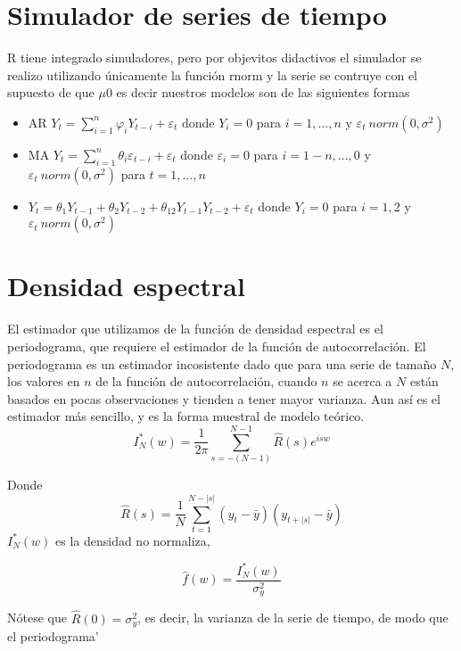 \documentclass[12pt,oneside]{book}
\renewcommand{\phi}{\varphi}
\renewcommand{\epsilon}{\varepsilon}
\begin{document}
 \section{Simulador de series de tiempo} %
 \label{sec:simulador_de_series_de_tiempo}
 R tiene integrado simuladores, pero por objevitos didactivos el simulador se realizo utilizando \'unicamente la funci\'on rnorm y la serie se contruye con el supuesto de que $\mu0$ es decir nuestros modelos son de las siguientes formas

\begin{itemize}
	\item AR $Y_t = \sum^n_{i=1}\phi_i Y_{t-i} + \epsilon_t$ donde $Y_i=0$ para $i=1, \dots, n$ y $\epsilon_t~norm(0,\sigma^2)$
	\item MA $Y_t = \sum^n_{i=1}\theta_i \epsilon_{t-i} + \epsilon_t$ donde $\epsilon_i=0$ para $i=1-n, \dots, 0$ y $\epsilon_t~norm(0,\sigma^2)$ para $t=1, \dots, n$
	\item $Y_t=\theta_1Y_{t-1}+\theta_2Y_{t-2}+\theta_{12}Y_{t-1}Y_{t-2}+\epsilon_t$ donde $Y_i=0$ para $i=1, 2$ y $\epsilon_t~norm(0, \sigma^2)$
\end{itemize}

\section{Densidad espectral} %
\label{sec:densidad_espectral}
El estimador que utilizamos de la funci\'on de densidad espectral es el periodograma, que requiere el estimador de la funci\'on de autocorrelaci\'on. El periodograma es un estimador incosistente dado que para una serie de tama\~no $N$, los valores en $n$ de la funci\'on de autocorrelaci\'on, cuando $n$ se acerca a $N$ est\'an basados en pocas observaciones y tienden a tener mayor varianza. Aun as\'i es el estimador m\'as sencillo, y es la forma muestral de modelo te\'orico.\\


$$I^*_{N}(w)=\frac{1}{2\pi}\sum^{N-1}_{s=-(N-1)}\hat{R}(s)e^{isw}$$

Donde 
$$\hat{R}(s)=\frac{1}{N}\sum^{N-|s|}_{t=1}(y_t-\bar{y})(y_{t+|s|}-\bar{y})$$
$I^*_{N}(w)$ es la densidad no normaliza, 

$$\hat{f}(w)=\frac{I^*_{N}(w)}{\sigma^2_y}$$

N\'otese que $\hat{R}(0)=\sigma^2_y$, es decir, la varianza de la serie de tiempo, de modo que el periodograma'
\end{document}
